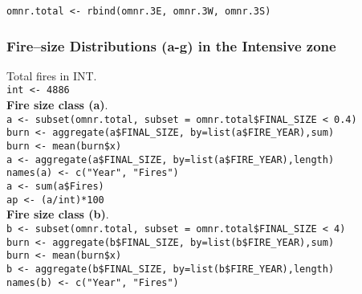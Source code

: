 \begin{spacing}{1.5}
\noindent \texttt{omnr.total <- rbind(omnr.3E, omnr.3W, omnr.3S)}

\subsubsection{Fire--size Distributions (a-g) in the Intensive zone}
\noindent Total fires in INT. \\

\noindent \texttt{int <- 4886} \\

\noindent \textbf{Fire size class (a)}. \\

\noindent \texttt{a <- subset(omnr.total, subset = omnr.total\$FINAL\_SIZE < 0.4)} \\

\noindent \texttt{burn <- aggregate(a\$FINAL\_SIZE, by=list(a\$FIRE\_YEAR),sum)} \\

\noindent \texttt{burn <- mean(burn\$x)} \\
                     
\noindent \texttt{a <- aggregate(a\$FINAL\_SIZE, by=list(a\$FIRE\_YEAR),length)} \\

\noindent \texttt{names(a) <- c("Year", "Fires")} \\

\noindent \texttt{a <- sum(a\$Fires)} \\

\noindent \texttt{ap <- (a/int)*100} \\

\noindent \textbf{Fire size class (b)}. \\

\noindent \texttt{b <- subset(omnr.total, subset = omnr.total\$FINAL\_SIZE < 4)} \\

\noindent \texttt{burn <- aggregate(b\$FINAL\_SIZE, by=list(b\$FIRE\_YEAR),sum)} \\

\noindent \texttt{burn <- mean(burn\$x)} \\
                     
\noindent \texttt{b <- aggregate(b\$FINAL\_SIZE, by=list(b\$FIRE\_YEAR),length)} \\

\noindent \texttt{names(b) <- c("Year", "Fires")} \\


\end{spacing}
